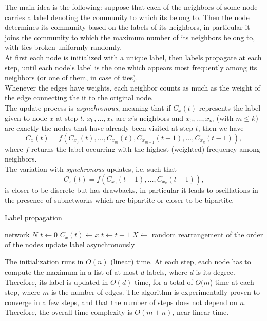 \documentclass[a4paper,11pt]{book}
\begin{document}
The main idea is the following: suppose that each of the neighbors of some node carries a label denoting the community to which its belong to. Then the node determines its community based on the labels of its neighbors, in particular it joins the community to which the maximum number of its neighbors belong to, with ties broken uniformly randomly.\\
At first each node is initialized with a unique label, then labels propagate at each step, until each node's label is the one which appears most frequently among its neighbors (or one of them, in case of ties).\\
Whenever the edges have weights, each neighbor counts as much as the weight of the edge connecting the it to the original node.\\

The update process is \textit{asynchronous}, meaning that if $C_x(t)$ represents the label given to node $x$ at step $t$, $x_0,\ldots,x_k$ are $x$'s neighbors and $x_0,\ldots,x_m$ (with $m\leq k$) are exactly the nodes that have already been visited at step $t$, then we have
$$
C_x(t) = f(C_{x_0}(t),\ldots,C_{x_m}(t),C_{x_{m+1}}(t-1),\ldots,C_{x_k}(t-1)),
$$
where $f$ returns the label occurring with the highest (weighted) frequency among neighbors.\\

The variation with \textit{synchronous} updates, i.e. such that
$$
C_x(t) = f(C_{x_0}(t-1),\ldots,C_{x_k}(t-1)),
$$
is closer to be discrete but has drawbacks, in particular it leads to oscillations in the presence of subnetworks which are bipartite or closer to be bipartite.
\begin{algorithm*}
\caption{Label propagation}
\begin{algorithmic}[1]
\Require network $N$
\State $t\gets 0$
\State $C_x(t)\gets x$
\EndFor
\Repeat
\State $t\gets t+1$
\State $X\gets$ random rearrangement of the order of the nodes
\State update label asynchronously
\EndFor
{}
\end{algorithmic}
\end{algorithm*}

The initialization runs in $O(n)$ (linear) time. At each step, each node has to compute the maximum in a list of at most $d$ labels, where $d$ is its degree. Therefore, its label is updated in $O(d)$ time, for a total of $O(m$) time at each step, where $m$ is the number of edges. The algorithm is experimentally proven to converge in a few steps, and that the number of steps does not depend on $n$. Therefore, the overall time complexity is $O(m+n)$, near linear time.
\newpage
\end{document}
